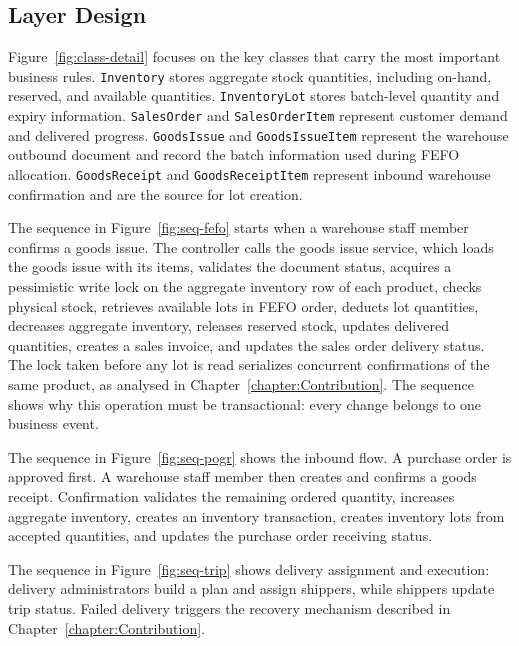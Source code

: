 \subsection{Layer Design}
Figure~\ref{fig:class-detail} focuses on the key classes that carry the most
important business rules. \texttt{Inventory} stores aggregate stock quantities,
including on-hand, reserved, and available quantities. \texttt{InventoryLot}
stores batch-level quantity and expiry information. \texttt{SalesOrder} and
\texttt{SalesOrderItem} represent customer demand and delivered progress.
\texttt{GoodsIssue} and \texttt{GoodsIssueItem} represent the warehouse outbound
document and record the batch information used during FEFO allocation.
\texttt{GoodsReceipt} and \texttt{GoodsReceiptItem} represent inbound warehouse
confirmation and are the source for lot creation.

The sequence in Figure~\ref{fig:seq-fefo} starts when a warehouse staff member
confirms a goods issue. The controller calls the goods issue service, which
loads the goods issue with its items, validates the document status, acquires a
pessimistic write lock on the aggregate inventory row of each product,
checks physical stock, retrieves available lots in FEFO order, deducts lot
quantities, decreases aggregate inventory, releases reserved stock, updates
delivered quantities, creates a sales invoice, and updates the sales order
delivery status. The lock taken before any lot is read serializes concurrent
confirmations of the same product, as analysed in
Chapter~\ref{chapter:Contribution}. The sequence shows why this operation must be
transactional: every change belongs to one business event.

The sequence in Figure~\ref{fig:seq-pogr} shows the inbound flow. A purchase
order is approved first. A warehouse staff member then creates and confirms a
goods receipt. Confirmation validates the remaining ordered quantity, increases
aggregate inventory, creates an inventory transaction, creates inventory lots
from accepted quantities, and updates the purchase order receiving status.

The
sequence in Figure~\ref{fig:seq-trip} shows delivery assignment and execution:
delivery administrators build a plan and assign shippers, while shippers update
trip status. Failed delivery triggers the recovery mechanism described in
Chapter~\ref{chapter:Contribution}.

